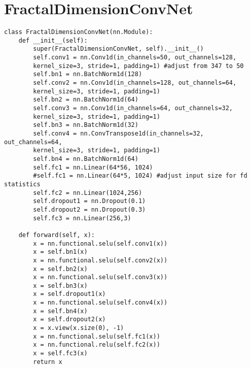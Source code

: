 \chapter{FractalDimensionConvNet}
\label{appendix3}
\begin{verbatim}
class FractalDimensionConvNet(nn.Module):
    def __init__(self):
        super(FractalDimensionConvNet, self).__init__()
        self.conv1 = nn.Conv1d(in_channels=50, out_channels=128, 
        kernel_size=3, stride=1, padding=1) #adjust from 347 to 50
        self.bn1 = nn.BatchNorm1d(128)
        self.conv2 = nn.Conv1d(in_channels=128, out_channels=64, 
        kernel_size=3, stride=1, padding=1)
        self.bn2 = nn.BatchNorm1d(64)
        self.conv3 = nn.Conv1d(in_channels=64, out_channels=32, 
        kernel_size=3, stride=1, padding=1)
        self.bn3 = nn.BatchNorm1d(32)
        self.conv4 = nn.ConvTranspose1d(in_channels=32, out_channels=64, 
        kernel_size=3, stride=1, padding=1)
        self.bn4 = nn.BatchNorm1d(64)
        self.fc1 = nn.Linear(64*56, 1024)
        #self.fc1 = nn.Linear(64*5, 1024) #adjust input size for fd statistics
        self.fc2 = nn.Linear(1024,256)
        self.dropout1 = nn.Dropout(0.1)
        self.dropout2 = nn.Dropout(0.3)
        self.fc3 = nn.Linear(256,3)

    def forward(self, x):
        x = nn.functional.selu(self.conv1(x))
        x = self.bn1(x)
        x = nn.functional.selu(self.conv2(x))
        x = self.bn2(x)
        x = nn.functional.selu(self.conv3(x))
        x = self.bn3(x)
        x = self.dropout1(x)
        x = nn.functional.selu(self.conv4(x))
        x = self.bn4(x)
        x = self.dropout2(x)
        x = x.view(x.size(0), -1)
        x = nn.functional.selu(self.fc1(x))
        x = nn.functional.relu(self.fc2(x))
        x = self.fc3(x)
        return x
\end{verbatim}